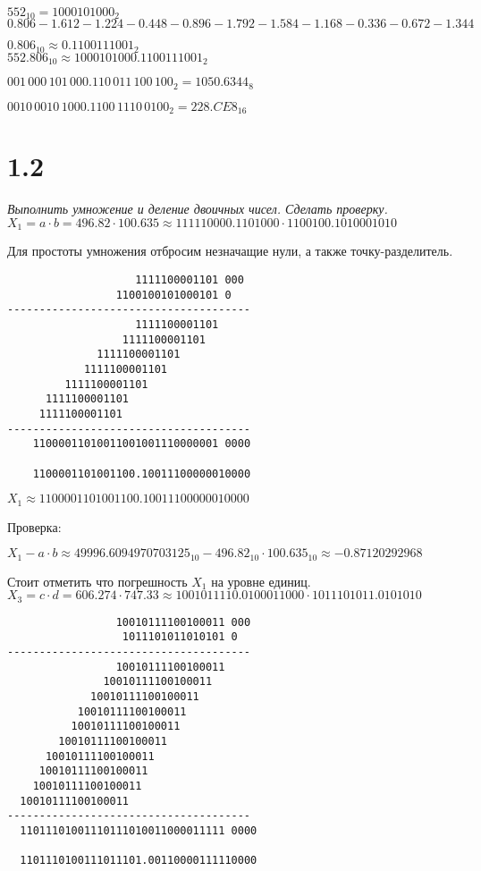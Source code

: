 \documentclass[a4paper,12pt]{article}
\begin{document}
$552_{10} = 1000101000_2$
\\

$0.806 - 1.612 - 1.224 - 0.448 - 0.896 - 1.792 - 1.584 - 1.168 - 0.336 - 0.672 - 1.344$

$0.806_{10} \approx 0.1100111001_2$
\\

$552.806_{10} \approx 1000101000.1100111001_2$

$001 \, 000 \, 101 \, 000.110 \, 011 \, 100 \, 100_2 = 1050.6344_8$

$0010 \, 0010 \, 1000.1100 \, 1110 \, 0100_2 = 228.CE8_{16}$

\newpage




\section*{1.2}

\textit{Выполнить умножение и деление двоичных чисел. Сделать проверку.}
\\

$X_1 = a \cdot b = 496.82 \cdot 100.635 \approx 111110000.1101000 \cdot 1100100.1010001010$

Для простоты умножения отбросим незначащие нули, а также точку-разделитель.

\begin{verbatim}
                    1111100001101 000
                 1100100101000101 0
--------------------------------------
                    1111100001101
                  1111100001101
              1111100001101
            1111100001101
         1111100001101
      1111100001101
     1111100001101
--------------------------------------
    11000011010011001001110000001 0000
 
    1100001101001100.10011100000010000
\end{verbatim}

$X_1 \approx 1100001101001100.10011100000010000$

Проверка:

$X_1 - a \cdot b \approx 49996.6094970703125_{10} - 496.82_{10} \cdot 100.635_{10} \approx -0.87120292968$

Стоит отметить что погрешность $X_1$ на уровне единиц.
\\

$X_3 = c \cdot d = 606.274 \cdot 747.33 \approx 1001011110.0100011000 \cdot 1011101011.0101010$

\begin{verbatim}
                 10010111100100011 000
                  1011101011010101 0
--------------------------------------
                 10010111100100011
               10010111100100011
             10010111100100011
           10010111100100011
          10010111100100011
        10010111100100011
      10010111100100011
     10010111100100011
    10010111100100011
  10010111100100011
--------------------------------------
  11011101001110111010011000011111 0000

  1101110100111011101.00110000111110000
\end{verbatim}
\end{document}
